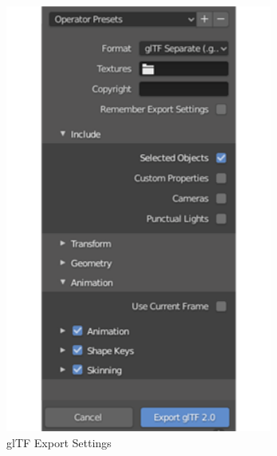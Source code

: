 \begin{figure}[!htbp]
\begin{minipage}{0.495\linewidth}
\includegraphics[width=1\linewidth]{img/cap5/glTFExportSettings}
\caption{glTF Export Settings} \label{fig:glTFExportSettings}
\end{minipage}
\end{figure}

